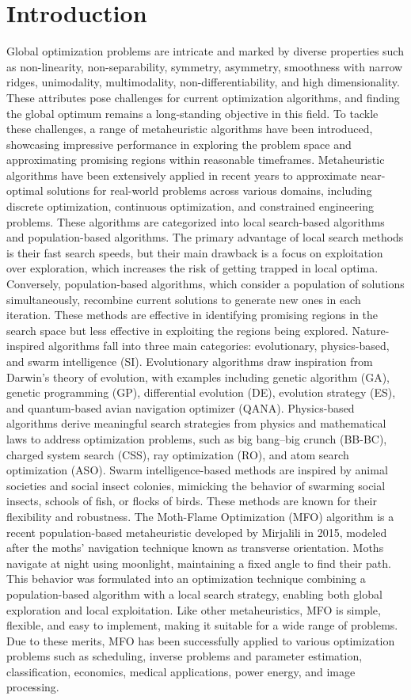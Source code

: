 \documentclass[conference]{IEEEtran}
\begin{document}
\section{Introduction}
Global optimization problems are intricate and marked by diverse properties such as non-linearity, non-separability, symmetry, asymmetry, smoothness with narrow ridges, unimodality, multimodality, non-differentiability, and high dimensionality. These attributes pose challenges for current optimization algorithms, and finding the global optimum remains a long-standing objective in this field. To tackle these challenges, a range of metaheuristic algorithms have been introduced, showcasing impressive performance in exploring the problem space and approximating promising regions within reasonable timeframes.
Metaheuristic algorithms have been extensively applied in recent years to approximate near-optimal solutions for real-world problems across various domains, including discrete optimization, continuous optimization, and constrained engineering problems. These algorithms are categorized into local search-based algorithms and population-based algorithms. The primary advantage of local search methods is their fast search speeds, but their main drawback is a focus on exploitation over exploration, which increases the risk of getting trapped in local optima. Conversely, population-based algorithms, which consider a population of solutions simultaneously, recombine current solutions to generate new ones in each iteration. These methods are effective in identifying promising regions in the search space but less effective in exploiting the regions being explored.
Nature-inspired algorithms fall into three main categories: evolutionary, physics-based, and swarm intelligence (SI). Evolutionary algorithms draw inspiration from Darwin's theory of evolution, with examples including genetic algorithm (GA), genetic programming (GP), differential evolution (DE), evolution strategy (ES), and quantum-based avian navigation optimizer (QANA). Physics-based algorithms derive meaningful search strategies from physics and mathematical laws to address optimization problems, such as big bang–big crunch (BB-BC), charged system search (CSS), ray optimization (RO), and atom search optimization (ASO). Swarm intelligence-based methods are inspired by animal societies and social insect colonies, mimicking the behavior of swarming social insects, schools of fish, or flocks of birds. These methods are known for their flexibility and robustness.
The Moth-Flame Optimization (MFO) algorithm is a recent population-based metaheuristic developed by Mirjalili in 2015, modeled after the moths' navigation technique known as transverse orientation. Moths navigate at night using moonlight, maintaining a fixed angle to find their path. This behavior was formulated into an optimization technique combining a population-based algorithm with a local search strategy, enabling both global exploration and local exploitation. Like other metaheuristics, MFO is simple, flexible, and easy to implement, making it suitable for a wide range of problems. Due to these merits, MFO has been successfully applied to various optimization problems such as scheduling, inverse problems and parameter estimation, classification, economics, medical applications, power energy, and image processing.
\end{document}
